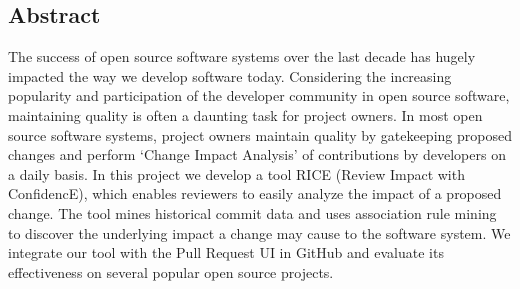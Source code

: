 
\subsection*{Abstract}
The success of open source software systems over the last decade has hugely impacted the way we develop software today. Considering the increasing popularity and participation of the developer community in open source software, maintaining quality is often a daunting task for project owners. In most open source software systems, project owners maintain quality by gatekeeping proposed changes and perform `Change Impact Analysis' of contributions by developers on a daily basis. In this project we develop a tool RICE (Review Impact with ConfidencE), which enables reviewers to easily analyze the impact of a proposed change. The tool mines historical commit data and uses association rule mining to discover the underlying impact a change may cause to the software system. We integrate our tool with the Pull Request UI in GitHub and evaluate its effectiveness on several popular open source projects.

